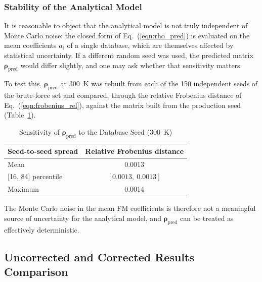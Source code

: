 \documentclass{style/nseJournal}
\begin{document}
\subsubsection{Stability of the Analytical Model}
\label{sec:stability_of_analytic_model}

It is reasonable to object that the analytical model is not truly independent of Monte Carlo noise: the closed form of Eq.~(\ref{eqn:rho_pred}) is evaluated on the mean coefficients $a_i$ of a single database, which are themselves affected by statistical uncertainty. If a different random seed was used, the predicted matrix $\boldsymbol\rho_{\text{pred}}$ would differ slightly, and one may ask whether that sensitivity matters.

To test this, $\boldsymbol\rho_{\text{pred}}$ at 300~K was rebuilt from each of the 150 independent seeds of the brute-force set and compared, through the relative Frobenius distance of Eq.~(\ref{eqn:frobenius_rel}), against the matrix built from the production seed (Table~\ref{tab:rho_pred_stability}).

\begin{table}[h]
\centering
\caption{Sensitivity of $\boldsymbol\rho_{\text{pred}}$ to the Database Seed (300~K)}
\label{tab:rho_pred_stability}
\begin{tabular}{lc}
\hline
Seed-to-seed spread & Relative Frobenius distance \\ \hline
Mean & 0.0013 \\
{}[16, 84] percentile & $[0.0013,\ 0.0013]$ \\
Maximum & 0.0014 \\ \hline
\end{tabular}
\end{table}

The Monte Carlo noise in the mean FM coefficients is therefore not a meaningful source of uncertainty for the analytical model, and $\boldsymbol\rho_{\text{pred}}$ can be treated as effectively deterministic.


\subsection{Uncorrected and Corrected Results Comparison}
\label{sec:res_raw_vs_corrected}
\end{document}
